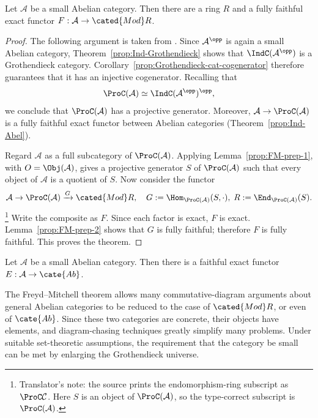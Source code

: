 \begin{theorem}\label{prop:FM}
	Let $\mathcal{A}$ be a small Abelian category. Then there are a ring $R$ and a fully faithful exact functor $F:\mathcal{A}\to\cated{Mod}R$.
\end{theorem}
\begin{proof}
	The following argument is taken from \cite[Theorem 9.6.10]{KS06}. Since $\mathcal{A}^{\opp}$ is again a small Abelian category, Theorem~\ref{prop:Ind-Grothendieck} shows that $\IndC(\mathcal{A}^{\opp})$ is a Grothendieck category. Corollary~\ref{prop:Grothendieck-cat-cogenerator} therefore guarantees that it has an injective cogenerator. Recalling that
	\[ \ProC(\mathcal{A}) \simeq \IndC(\mathcal{A}^{\opp})^{\opp}, \]
	we conclude that $\ProC(\mathcal{A})$ has a projective generator. Moreover, $\mathcal{A}\to\ProC(\mathcal{A})$ is a fully faithful exact functor between Abelian categories (Theorem~\ref{prop:Ind-Abel}).

	Regard $\mathcal{A}$ as a full subcategory of $\ProC(\mathcal{A})$. Applying Lemma~\ref{prop:FM-prep-1}, with $O=\Obj(\mathcal{A})$, gives a projective generator $S$ of $\ProC(\mathcal{A})$ such that every object of $\mathcal{A}$ is a quotient of $S$. Now consider the functor
	\[ \mathcal{A} \to \ProC(\mathcal{A}) \xrightarrow{G} \cated{Mod}R , \quad G := \Hom_{\ProC(\mathcal{A})}(S, \cdot), \; R := \End_{\ProC(\mathcal{A})}(S). \]\footnote{Translator's note: the source prints the endomorphism-ring subscript as $\ProC\mathcal{C}$. Here $S$ is an object of $\ProC(\mathcal{A})$, so the type-correct subscript is $\ProC(\mathcal{A})$.}
	Write the composite as $F$. Since each factor is exact, $F$ is exact. Lemma~\ref{prop:FM-prep-2} shows that $G$ is fully faithful; therefore $F$ is fully faithful. This proves the theorem.
\end{proof}

\begin{corollary}
	Let $\mathcal{A}$ be a small Abelian category. Then there is a faithful exact functor $E:\mathcal{A}\to\cate{Ab}$.
\end{corollary}

The Freyd--Mitchell theorem allows many commutative-diagram arguments about general Abelian categories to be reduced to the case of $\cated{Mod}R$, or even of $\cate{Ab}$. Since these two categories are concrete, their objects have elements, and diagram-chasing techniques \cite[\S 6.8]{Li1} greatly simplify many problems. Under suitable set-theoretic assumptions, the requirement that the category be small can be met by enlarging the Grothendieck universe.
